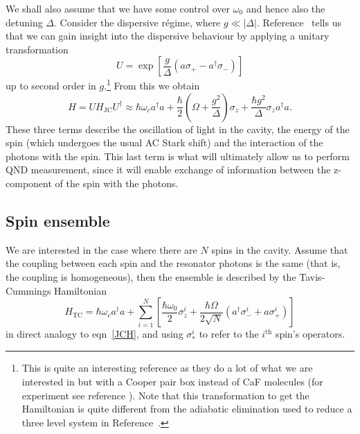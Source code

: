 \documentclass{article}
\begin{document}
We shall also assume that we have some control over $\omega_0$ and hence also
the detuning $\Delta$. Consider the dispersive r\'egime, where  $g\ll|\Delta|$.
Reference~\cite{PhysRevA.69.062320} tells us that we can gain insight into the
dispersive behaviour by applying  a unitary transformation
%
\begin{equation} U = \exp \left[\frac{g}{\Delta}(a\sigma_+ -
a^\dagger\sigma_-)\right] \end{equation}
%
up to second order in $g$.\footnote{This is quite an interesting reference as
they do a lot of what we are interested in but with a Cooper pair box instead
of CaF molecules (for experiment see reference \cite{Wallraff2004}). Note that
this transformation to get the Hamiltonian is quite different from the
adiabatic elimination used to reduce a three level system in
Reference~\cite{SchleierSmith2011}.} From this we obtain
%
\begin{equation} H= UH_\text{JC}U^\dagger \approx \hbar \omega_c
  a^\dagger a + \frac{\hbar}{2}\left(\Omega +
  \frac{g^2}{\Delta}\right)\sigma_z + \frac{\hbar
  g^2}{\Delta}\sigma_z a^\dagger a.  \end{equation}
%
These three terms describe the oscillation of light in the cavity, the energy
of the spin (which undergoes the usual AC Stark shift) and the interaction of
the photons with the spin. This last term is what will ultimately allow us to
perform QND measurement, since it will enable exchange of information between
the z-component of the spin with the photons.

\subsection{Spin ensemble}

We are interested in the case where there are $N$ spins in the
cavity. Assume that the coupling between each spin and the resonator photons is
the same (that is, the coupling is homogeneous), then the ensemble is described
by the Tavis-Cummings Hamiltonian~\cite{Kirton2019}
%
\begin{equation}
  H_\text{TC}=  \hbar \omega_c a^\dagger a + \sum_{i=1}^N\left[
    \frac{\hbar\omega_0}{2}\sigma_z^i +\frac{\hbar\Omega}{2\sqrt{N}}(a^\dagger
    \sigma^i_- + a\sigma^i_+)\right]
\end{equation}
%
in direct analogy to eqn~\ref{JCH}, and using $\sigma_*^i$ to refer to the
$i^\text{th}$ spin's operators.
\end{document}
